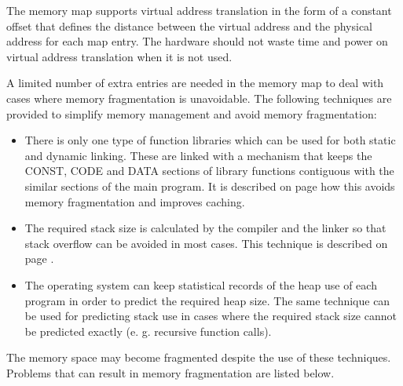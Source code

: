 \documentclass[forwardcom.tex]{subfiles}
\begin{document}
The memory map supports virtual address translation in the form of a constant offset that defines the distance between the virtual address and the physical address for each map entry. The hardware should not waste time and power on virtual address translation when it is not used.
\vv

A limited number of extra entries are needed in the memory map to deal with cases where memory fragmentation is unavoidable. The following techniques are provided to simplify memory management and avoid memory fragmentation:

\begin{itemize}
\item There is only one type of function libraries which can be used for both static and dynamic linking. These are linked with a mechanism that keeps the CONST, CODE and DATA sections of library functions contiguous with the similar sections of the main program. It is described on page \pageref{libraryLinkMethods} how this avoids memory fragmentation and improves caching.

\item The required stack size is calculated by the compiler and the linker so that stack overflow can be avoided in most cases. This technique is described on page \pageref{predictingStackSize}.

\item The operating system can keep statistical records of the heap use of each program in order to predict the required heap size. The same technique can be used for predicting stack use in cases where the required stack size cannot be predicted exactly (e. g. recursive function calls). 
\end{itemize}

The memory space may become fragmented despite the use of these techniques. Problems that can result in memory fragmentation are listed below. 
\end{document}
